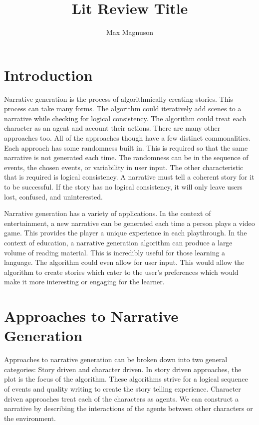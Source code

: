 \documentclass[]{article}
\title{Lit Review Title}
\author{Max Magnuson}
\begin{document}
\maketitle

\begin{abstract}
	
\end{abstract}

\section{Introduction}
Narrative generation is the process of algorithmically creating stories. This process can take many forms. The algorithm could iteratively add scenes to a narrative while checking for logical consistency. The algorithm could treat each character as an agent and account their actions. There are many other approaches too. All of the approaches though have a few distinct commonalities. Each approach has some randomness built in. This is required so that the same narrative is not generated each time. The randomness can be in the sequence of events, the chosen events, or variability in user input. The other characteristic that is required is logical consistency. A narrative must tell a coherent story for it to be successful. If the story has no logical consistency, it will only leave users lost, confused, and uninterested.   

Narrative generation has a variety of applications. In the context of entertainment, a new narrative can be generated each time a person plays a video game. This provides the player a unique experience in each playthrough. In the context of education, a narrative generation algorithm can produce a large volume of reading material. This is incredibly useful for those learning a language. The algorithm could even allow for user input. This would allow the algorithm to create stories which cater to the user's preferences which would make it more interesting or engaging for the learner. 

\section{Approaches to Narrative Generation}
Approaches to narrative generation can be broken down into two general categories: Story driven and character driven. In story driven approaches, the plot is the focus of the algorithm. These algorithms strive for a logical sequence of events and quality writing to create the story telling experience. Character driven approaches treat each of the characters as agents. We can construct a narrative by describing the interactions of the agents between other characters or the environment.
\end{document}
